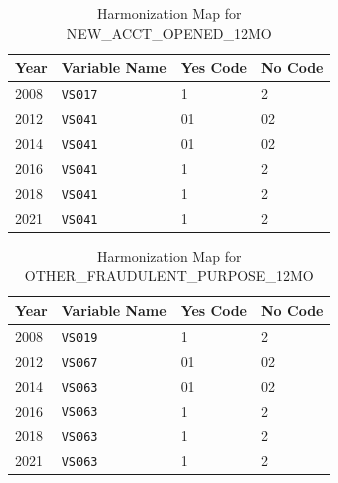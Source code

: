 \begin{table}[ht]
\centering
\caption{Harmonization Map for NEW\_ACCT\_OPENED\_12MO}
\label{tab:new_acct_codes}
\begin{tabular}{llll}
\toprule
\textbf{Year} & \textbf{Variable Name} & \textbf{Yes Code} & \textbf{No Code} \\
\midrule
2008 & \texttt{VS017} & 1  & 2  \\
2012 & \texttt{VS041} & 01 & 02 \\
2014 & \texttt{VS041} & 01 & 02 \\
2016 & \texttt{VS041} & 1  & 2  \\
2018 & \texttt{VS041} & 1  & 2  \\
2021 & \texttt{VS041} & 1  & 2  \\
\bottomrule
\end{tabular}
\end{table}

\begin{table}[ht]
\centering
\caption{Harmonization Map for OTHER\_FRAUDULENT\_PURPOSE\_12MO}
\label{tab:other_fraud_codes}
\begin{tabular}{llll}
\toprule
\textbf{Year} & \textbf{Variable Name} & \textbf{Yes Code} & \textbf{No Code} \\
\midrule
2008 & \texttt{VS019} & 1  & 2  \\
2012 & \texttt{VS067} & 01 & 02 \\
2014 & \texttt{VS063} & 01 & 02 \\
2016 & \texttt{VS063} & 1  & 2  \\
2018 & \texttt{VS063} & 1  & 2  \\
2021 & \texttt{VS063} & 1  & 2  \\
\bottomrule
\end{tabular}
\end{table}

